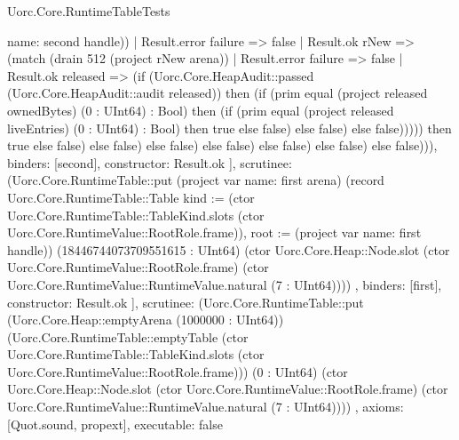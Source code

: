 \begin{lexlean}{Uorc.Core.RuntimeTableTests}
\begin{semanticmodule}
{{{{{{                          name: second
                        } handle))
                        | Result.error failure => false
                        | Result.ok rNew => (match (drain 512 (project rNew arena))
                          | Result.error failure => false
                          | Result.ok released => (if (Uorc.Core.HeapAudit::passed (Uorc.Core.HeapAudit::audit released)) then (if (prim equal (project released ownedBytes) (0 : UInt64) : Bool) then (if (prim equal (project released liveEntries) (0 : UInt64) : Bool) then true else false) else false) else false))))) then true else false) else false) else false) else false) else false) else false) else false))),
              binders: [second],
              constructor: Result.ok
            }
          ],
          scrutinee: (Uorc.Core.RuntimeTable::put (project var{
            name: first
          } arena) (record Uorc.Core.RuntimeTable::Table {kind := (ctor Uorc.Core.RuntimeTable::TableKind.slots (ctor Uorc.Core.RuntimeValue::RootRole.frame)), root := (project var{
            name: first
          } handle)}) (18446744073709551615 : UInt64) (ctor Uorc.Core.Heap::Node.slot (ctor Uorc.Core.RuntimeValue::RootRole.frame) (ctor Uorc.Core.RuntimeValue::RuntimeValue.natural (7 : UInt64))))
        },
        binders: [first],
        constructor: Result.ok
      }
    ],
    scrutinee: (Uorc.Core.RuntimeTable::put (Uorc.Core.Heap::emptyArena (1000000 : UInt64)) (Uorc.Core.RuntimeTable::emptyTable (ctor Uorc.Core.RuntimeTable::TableKind.slots (ctor Uorc.Core.RuntimeValue::RootRole.frame))) (0 : UInt64) (ctor Uorc.Core.Heap::Node.slot (ctor Uorc.Core.RuntimeValue::RootRole.frame) (ctor Uorc.Core.RuntimeValue::RuntimeValue.natural (7 : UInt64))))
  },
  axioms: [Quot.sound, propext],
  executable: false
}


\end{semanticmodule}
\end{lexlean}
